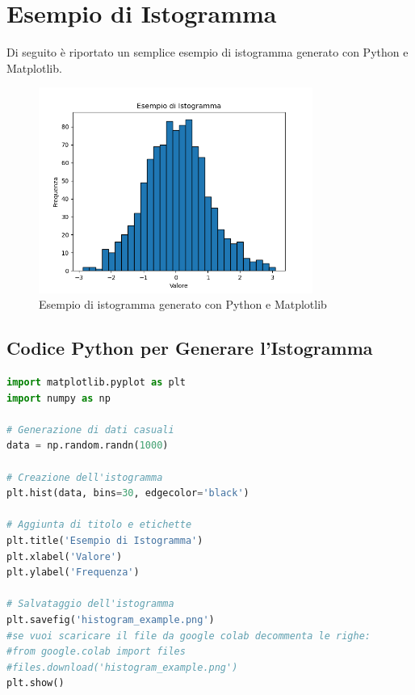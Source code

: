 \section{Esempio di Istogramma}

Di seguito è riportato un semplice esempio di istogramma generato con Python e Matplotlib.

\begin{figure}[h!]
    \centering
    \includegraphics[width=0.8\textwidth]{histogram_example.png}
    \caption{Esempio di istogramma generato con Python e Matplotlib}
    \label{fig:histogram_example}
\end{figure}

\subsection{Codice Python per Generare l'Istogramma}

\begin{lstlisting}[language=Python, caption=Codice Python per generare un istogramma, label=code:histogram]
import matplotlib.pyplot as plt
import numpy as np

# Generazione di dati casuali
data = np.random.randn(1000)

# Creazione dell'istogramma
plt.hist(data, bins=30, edgecolor='black')

# Aggiunta di titolo e etichette
plt.title('Esempio di Istogramma')
plt.xlabel('Valore')
plt.ylabel('Frequenza')

# Salvataggio dell'istogramma
plt.savefig('histogram_example.png')
#se vuoi scaricare il file da google colab decommenta le righe:
#from google.colab import files
#files.download('histogram_example.png')
plt.show()
\end{lstlisting}

